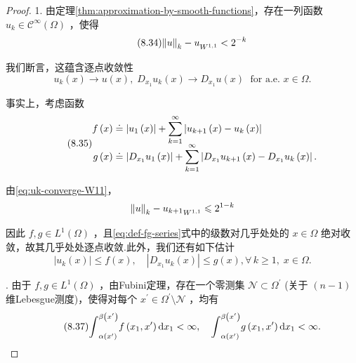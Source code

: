\begin{proof}
1. 由定理\ref{thm:approximation-by-smooth-functions}，存在一列函数 ${u}_{k} \in  {\mathcal{C}}^{\infty }\left( \Omega \right)$ ，使得
\begin{equation}\tag{8.34}\label{eq:uk-converge-W11}
{\norm{u}_{k} - u}_{{W}^{1,1}} < {2}^{-k}
\end{equation}

我们断言，这蕴含逐点收敛性
\[
{u}_{k}\left( x\right)  \rightarrow  u\left( x\right) ,\;{D}_{{x}_{1}}{u}_{k}\left( x\right)  \rightarrow  {D}_{{x}_{1}}u\left( x\right) \;\text{ for a.e. }x \in  \Omega .
\]

事实上，考虑函数
\begin{equation}\tag{8.35}\label{eq:def-fg-series}
{\setjot[-2]\begin{aligned}
f\left( x\right)  &\doteq  \left| {{u}_{1}\left( x\right) }\right|  + \sum_{{k = 1}}^{\infty }\left| {{u}_{k + 1}\left( x\right)  - {u}_{k}\left( x\right) }\right| \\
g\left( x\right)  &\doteq  \left| {{D}_{{x}_{1}}{u}_{1}\left( x\right) }\right|  + \sum_{{k = 1}}^{\infty }\left| {{D}_{{x}_{1}}{u}_{k + 1}\left( x\right)  - {D}_{{x}_{1}}{u}_{k}\left( x\right) }\right| .
\end{aligned}}
\end{equation}

由\eqref{eq:uk-converge-W11}，
\[
{\norm{u}_{k} - {u}_{k + 1}}_{{W}^{1,1}} \leqslant  {2}^{1 - k}
\]

因此 $f,g \in  {L}^{1}\left( \Omega \right)$ ，且\eqref{eq:def-fg-series}式中的级数对几乎处处的 $x \in  \Omega$ 绝对收敛，故其几乎处处逐点收敛.此外，我们还有如下估计
\begin{equation}\tag{8.36}\label{eq:uk-bounded-by-fg}
\left| {{u}_{k}\left( x\right) }\right| \leq  f\left( x\right) ,\quad \left| {{D}_{{x}_{1}}{u}_{k}\left( x\right) }\right| \leq  g\left( x\right),\forall\,k \geq  1,\;x \in  \Omega .
\end{equation}

. 由于 $f,g \in  {L}^{1}\left( \Omega \right)$ ，由Fubini定理，存在一个零测集 $\mathcal{N} \subset  {\Omega }^{\prime }$ (关于 $\left( {n - 1}\right)$ 维Lebesgue测度)，使得对每个 ${x}^{\prime } \in  {\Omega }^{\prime } \setminus  \mathcal{N}$ ，均有
\begin{equation}\tag{8.37}\label{eq:fg-integrable-slices}
{\int }_{\alpha \left( {x}^{\prime }\right) }^{\beta \left( {x}^{\prime }\right) }f\left( {{x}_{1},{x}^{\prime }}\right) \mathop{}\!\mathrm{d} x_{1} < \infty ,\quad {\int }_{\alpha \left( {x}^{\prime }\right) }^{\beta \left( {x}^{\prime }\right) }g\left( {{x}_{1},{x}^{\prime }}\right) \mathop{}\!\mathrm{d} x_{1} < \infty .
\end{equation}


\end{proof}
